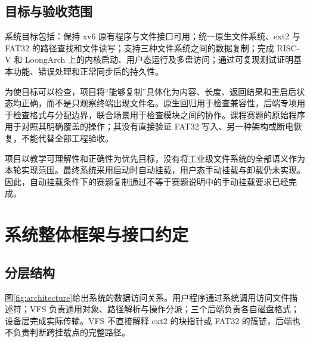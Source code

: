 \documentclass[conference]{IEEEtran}
\begin{document}
\subsection{目标与验收范围}
系统目标包括：保持 xv6 原有程序与文件接口可用；统一原生文件系统、ext2 与 FAT32 的路径查找和文件读写；支持三种文件系统之间的数据复制；完成 RISC-V 和 LoongArch 上的内核启动、用户态运行及多盘访问；通过可复现测试证明基本功能、错误处理和正常同步后的持久性。

为使目标可以检查，项目将“能够复制”具体化为内容、长度、返回结果和重启后状态均正确，而不是只观察终端出现文件名。原生回归用于检查兼容性，后端专项用于检查格式与分配边界，联合场景用于检查模块之间的协作。课程赛题的原始程序用于对照其明确覆盖的操作；其没有直接验证 FAT32 写入、另一种架构或断电恢复，不能代替全部工程验收。

项目以教学可理解性和正确性为优先目标，没有将工业级文件系统的全部语义作为本轮实现范围。最终系统采用启动时自动挂载，用户态手动挂载与卸载仍未实现。因此，自动挂载条件下的赛题复制通过不等于赛题说明中的手动挂载要求已经完成。

\section{系统整体框架与接口约定}
\subsection{分层结构}
图\ref{fig:architecture}给出系统的数据访问关系。用户程序通过系统调用访问文件描述符；VFS 负责通用对象、路径解析与操作分派；三个后端负责各自磁盘格式；设备层完成实际传输。VFS 不直接解释 ext2 的块指针或 FAT32 的簇链，后端也不负责判断跨挂载点的完整路径。
\end{document}
